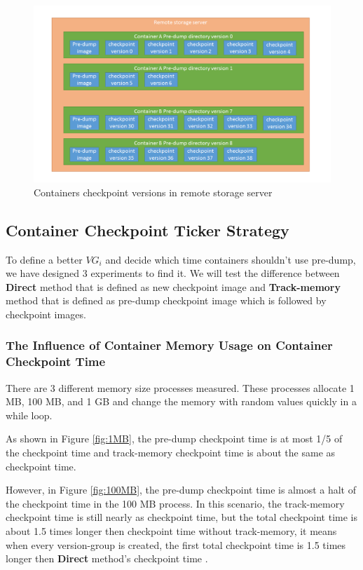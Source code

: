 \begin{figure}[hbtp]
\begin{center}
\includegraphics[width=15cm]{figure/checkpoint_demo.png}
\end{center}
\caption{Containers checkpoint versions in remote storage server}
\label{fig:Containers checkpoint versions in remote storage server}
\end{figure}

\subsection{Container Checkpoint Ticker Strategy}
\label{sec:Ticker Strategy}
To define a better $VG_i$ and decide which time containers shouldn't use pre-dump, we have designed 3 experiments to find it. We will test the difference between \textbf{Direct} method that is defined as new checkpoint image and \textbf{Track-memory} method that is defined as pre-dump checkpoint image which is followed by checkpoint images.

\subsubsection{The Influence of Container Memory Usage on Container Checkpoint Time}
\label{sec:Memory Size}
There are 3 different memory size processes measured. These processes allocate 1 MB, 100 MB, and 1 GB and change the memory with random values quickly in a while loop.

As shown in Figure \ref{fig:1MB}, the pre-dump checkpoint time is at most 1/5 of the checkpoint time and track-memory checkpoint time is about the same as checkpoint time.

However, in Figure \ref{fig:100MB}, the pre-dump checkpoint time is almost a halt of the checkpoint time in the 100 MB process.
In this scenario, the track-memory checkpoint time is still nearly as checkpoint time, but the total checkpoint time is about 1.5 times longer then checkpoint time without track-memory, it means when every version-group is created, the first total checkpoint time is 1.5 times longer then \textbf{Direct} method's checkpoint time .

